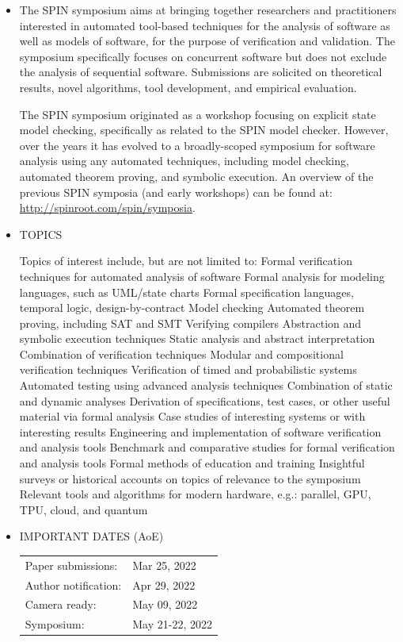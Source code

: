 \documentclass[prodmode,acmtecs]{acmsmall} %
\begin{document}
\begin{itemize}\item  The SPIN symposium aims at bringing together researchers and practitioners interested in automated tool-based techniques for the analysis of software as well as models of software, for the purpose of verification and validation. The symposium specifically focuses on concurrent software but does not exclude the analysis of sequential software. Submissions are solicited on theoretical results, novel algorithms, tool development, and empirical evaluation. 
 
  The SPIN symposium originated as a workshop focusing on explicit state model checking, specifically as related to the SPIN model checker. However, over the years it has evolved to a broadly-scoped symposium for software analysis using any automated techniques, including model checking, automated theorem proving, and symbolic execution. An overview of the previous SPIN symposia (and early workshops) can be found at: \href{http://spinroot.com/spin/symposia}{http://spinroot.com/spin/symposia}. 
 
\item   TOPICS 
 
  Topics of interest include, but are not limited to: Formal verification techniques for automated analysis of software Formal analysis for modeling languages, such as UML/state charts Formal specification languages, temporal logic, design-by-contract Model checking Automated theorem proving, including SAT and SMT Verifying compilers Abstraction and symbolic execution techniques Static analysis and abstract interpretation Combination of verification techniques Modular and compositional verification techniques Verification of timed and probabilistic systems Automated testing using advanced analysis techniques Combination of static and dynamic analyses Derivation of specifications, test cases, or other useful material via formal analysis Case studies of interesting systems or with interesting results Engineering and implementation of software verification and analysis tools Benchmark and comparative studies for formal verification and analysis tools Formal methods of education and training Insightful surveys or historical accounts on topics of relevance to the symposium Relevant tools and algorithms for modern hardware, e.g.: parallel, GPU, TPU, cloud, and quantum  
 
\item  IMPORTANT DATES (AoE) 
 
\begin{tabulary}{\linewidth}{LL}Paper submissions:  & Mar 25, 2022 \\
Author notification:  & Apr 29, 2022 \\
Camera ready:  & May 09, 2022 \\
Symposium:  & May 21-22, 2022 \\
\end{tabulary}
 

\end{itemize}
\end{document}
